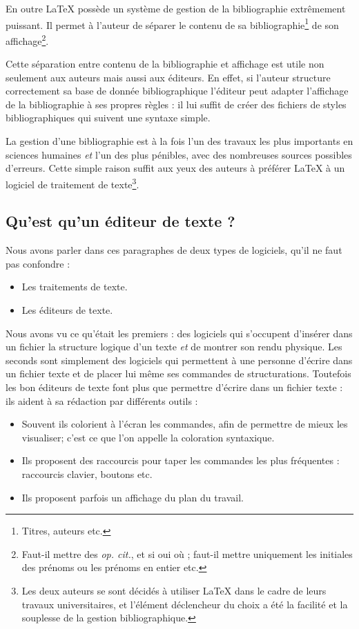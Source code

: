 En outre \LaTeX{} possède un système de gestion de la bibliographie extrêmement puissant. Il permet à l'auteur de séparer le contenu de sa bibliographie\footnote{Titres, auteurs etc.} de son affichage\footnote{Faut-il mettre des \emph{op. cit.}, et si oui où ; faut-il mettre uniquement les initiales des prénoms ou les prénoms en entier etc.}.

Cette séparation entre contenu de la bibliographie et affichage est utile non seulement aux auteurs mais aussi aux éditeurs. En effet, si l'auteur structure correctement sa base de donnée bibliographique l'éditeur peut adapter l'affichage de la bibliographie à ses propres règles : il lui suffit de créer des fichiers de styles bibliographiques qui suivent une syntaxe simple.

La gestion d'une bibliographie est à la fois l'un des travaux les plus importants en sciences humaines \emph{et} l'un des plus pénibles, avec des nombreuses sources possibles d'erreurs. Cette simple raison suffit aux yeux des auteurs à préférer \LaTeX{} à un logiciel de traitement de texte\footnote{Les deux auteurs se sont décidés à utiliser \LaTeX{} dans le cadre de leurs travaux universitaires, et l'élément déclencheur du choix a été la facilité et la souplesse de la gestion bibliographique.}.



\subsection{Qu'est qu'un éditeur de texte ?}

Nous avons parler dans ces paragraphes de deux types de logiciels, qu'il ne faut pas confondre :
\begin{itemize}
	\item Les traitements de texte.
	\item Les éditeurs de texte.
\end{itemize}

Nous avons vu ce qu'était les premiers : des logiciels qui s'occupent d'insérer dans un fichier la structure logique d'un texte \emph{et} de montrer son rendu physique.
Les seconds sont simplement des logiciels qui permettent à une personne d'écrire dans un fichier texte et de placer lui même ses commandes de structurations.
Toutefois les bon éditeurs de texte font plus que permettre d'écrire dans un fichier texte : ils aident à sa rédaction par différents outils :
\begin{itemize}
\item Souvent ils colorient à l'écran les commandes, afin de permettre de mieux les visualiser; c'est ce que l'on appelle la coloration syntaxique.
\item Ils proposent des raccourcis pour taper les commandes les plus fréquentes :  raccourcis clavier, boutons etc.
\item Ils proposent parfois un affichage du plan du travail.
\end{itemize}

